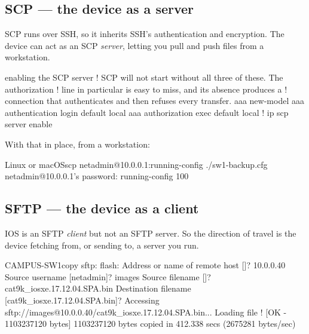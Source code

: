 \subsection{SCP --- the device as a server}

SCP runs over SSH, so it inherits SSH's authentication and encryption. The device
can act as an SCP \emph{server}, letting you pull and push files from a
workstation.

\begin{config}{enabling the SCP server}
! SCP will not start without all three of these. The authorization
! line in particular is easy to miss, and its absence produces a
! connection that authenticates and then refuses every transfer.
aaa new-model
aaa authentication login default local
aaa authorization exec default local
!
ip scp server enable
\end{config}

With that in place, from a workstation:

\begin{hostcmd}{Linux or macOS}{scp netadmin@10.0.0.1:running-config ./sw1-backup.cfg}
netadmin@10.0.0.1's password:
running-config                       100%
\end{hostcmd}

\subsection{SFTP --- the device as a client}

IOS is an SFTP \emph{client} but not an SFTP server. So the direction of travel
is the device fetching from, or sending to, a server you run.

\begin{verify}{CAMPUS-SW1}{copy sftp: flash:}
Address or name of remote host []? 10.0.0.40
Source username [netadmin]? images
Source filename []? cat9k_iosxe.17.12.04.SPA.bin
Destination filename [cat9k_iosxe.17.12.04.SPA.bin]?
Accessing sftp://images@10.0.0.40/cat9k_iosxe.17.12.04.SPA.bin...
Loading file ! [OK - 1103237120 bytes]
1103237120 bytes copied in 412.338 secs (2675281 bytes/sec)
\end{verify}


